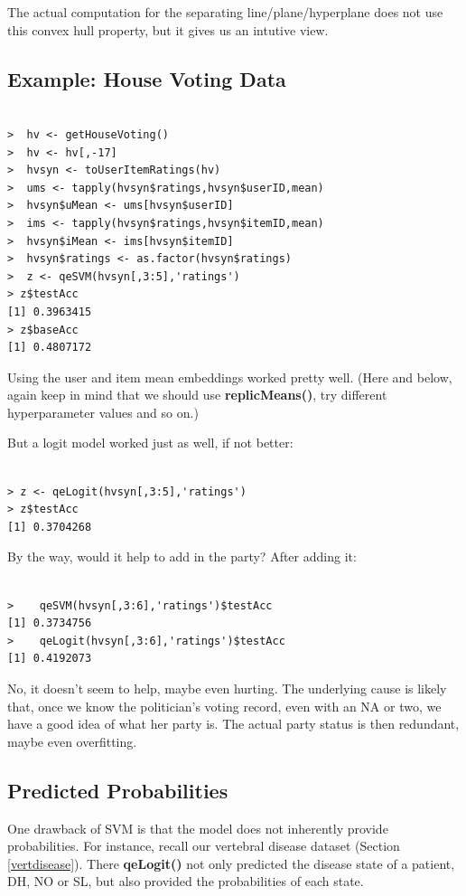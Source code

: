 The actual computation for the separating line/plane/hyperplane does not
use this convex hull property, but it gives us an intutive view.

\subsection{Example:  House Voting Data}

\begin{lstlisting}

>  hv <- getHouseVoting()
>  hv <- hv[,-17]
>  hvsyn <- toUserItemRatings(hv)
>  ums <- tapply(hvsyn$ratings,hvsyn$userID,mean)
>  hvsyn$uMean <- ums[hvsyn$userID]
>  ims <- tapply(hvsyn$ratings,hvsyn$itemID,mean)
>  hvsyn$iMean <- ims[hvsyn$itemID]
>  hvsyn$ratings <- as.factor(hvsyn$ratings)
>  z <- qeSVM(hvsyn[,3:5],'ratings')
> z$testAcc
[1] 0.3963415
> z$baseAcc
[1] 0.4807172
\end{lstlisting}

Using the user and item mean embeddings worked pretty well.  (Here and
below, again keep in mind that we should use \textbf{replicMeans()}, try
different hyperparameter values and so on.)

But a logit model worked just as well, if not better:

\begin{lstlisting}

> z <- qeLogit(hvsyn[,3:5],'ratings')
> z$testAcc
[1] 0.3704268

\end{lstlisting}

By the way, would it help to add in the party?  After adding it:

\begin{lstlisting}

>    qeSVM(hvsyn[,3:6],'ratings')$testAcc
[1] 0.3734756
>    qeLogit(hvsyn[,3:6],'ratings')$testAcc
[1] 0.4192073
\end{lstlisting}

No, it doesn't seem to help, maybe even hurting.  The underlying cause is
likely that, once we know the politician's voting record, even with an
NA or two, we have a good idea of what her party is.  The actual party
status is then redundant, maybe even overfitting.

\subsection{Predicted Probabilities}

One drawback of SVM is that the model does not inherently provide
probabilities.  For instance, recall our vertebral disease dataset
(Section \ref{vertdisease}).  There \textbf{qeLogit()} not only
predicted the disease state of a patient, DH, NO or SL, but also
provided the probabilities of each state.  

